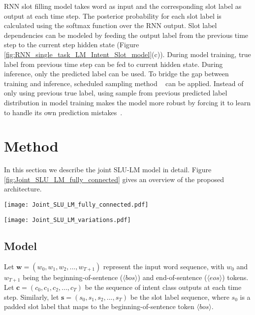 \documentclass[11pt]{article}
\begin{document}
    RNN slot filling model takes word as input and the corresponding slot label as output at each time step. The posterior probability for each slot label is calculated using the softmax function over the RNN output. Slot label dependencies can be modeled by feeding the output label from the previous time step to the current step hidden state (Figure \ref{fig:RNN_single_task_LM_Intent_Slot_model}(c)). During model training, true label from previous time step can be fed to current hidden state. During inference, only the predicted label can be used. To bridge the gap between training and inference, scheduled sampling method ~\cite{bengio:15} can be applied. Instead of only using previous true label, using sample from previous predicted label distribution in model training makes the model more robust by forcing it to learn to handle its own prediction mistakes~\cite{liu:15}.

\section{Method}
    In this section we describe the joint SLU-LM model in detail. Figure \ref{fig:Joint_SLU_LM_fully_connected} gives an overview of the proposed architecture.
        \begin{figure*}[t]
            \centering
            \texttt{[image: Joint\_SLU\_LM\_fully\_connected.pdf]}
            \caption{{Proposed joint online RNN model for intent detection, slot filling, and next word prediction. }}
            \label{fig:Joint_SLU_LM_fully_connected}
        \end{figure*}
        \begin{figure*}[t]
            \centering
            \texttt{[image: Joint\_SLU\_LM\_variations.pdf]}
            \caption{{Joint online SLU-LM model variations. (a) Basic joint model with no conditional dependencies on emitted intent classes and slot labels. (b) Joint model with local intent context. Next word prediction is conditioned on the current step intent class. (c) Joint model with recurrent intent context. The entire intent prediction history and variations are captured in the RNN state. (d) Joint model with both local and recurrent intent context. }}
            \label{fig:Joint_SLU_LM_variations}
        \end{figure*}
    
\subsection{Model}
    Let $\mathbf{w}=(w_0, w_1, w_2, ..., w_{T+1})$ represent the input word sequence, with $w_0$ and $w_{T+1}$ being the beginning-of-sentence ($\langle bos \rangle$) and end-of-sentence ($\langle eos \rangle$) tokens. Let $\mathbf{c}=(c_0, c_1, c_2, ..., c_{T})$ be the sequence of intent class outputs at each time step. Similarly, let $\mathbf{s}=(s_0, s_1, s_2, ..., s_{T})$ be the slot label sequence, where $s_0$ is a padded slot label that maps to the beginning-of-sentence token $\langle bos \rangle$.
    
\end{document}
